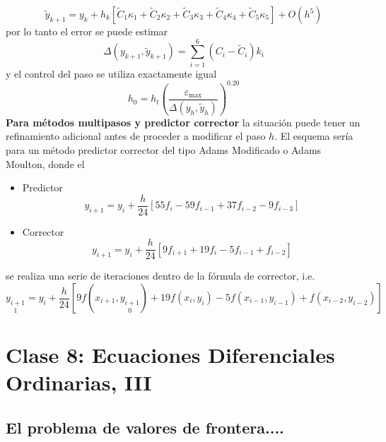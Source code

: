 \documentclass[spanish,titlepage,11pt]{article}
\begin{document}
\[
\tilde{y}_{k+1}=y_{k}+h_{k}\left[  \tilde{C}_{1}\kappa_{1}+\tilde{C}_{2}%
\kappa_{2}+\tilde{C}_{3}\kappa_{3}+\tilde{C}_{4}\kappa_{4}+\tilde{C}_{5}%
\kappa_{5}\right]  +O(h^{5})
\]
por lo tanto el error se puede estimar
\[
\Delta\left(  y_{k+1},\tilde{y}_{k+1}\right)  =\sum_{i=1}^{6}\left(
C_{i}-\tilde{C}_{i}\right)  k_{i}
\]
y el control del paso se utiliza exactamente igual
\[
h_{0}=h_{t}\left(  \frac{\varepsilon_{\max}}{\Delta\left(  y_{h},\tilde{y}%
_{h}\right)  }\right)  ^{0.20}
\]
\textbf{Para m\'{e}todos multipasos y predictor corrector} la situaci\'{o}n
puede tener un refinamiento adicional antes de proceder a modificar el paso
$h$. El esquema ser\'{i}a para un m\'{e}todo predictor corrector del tipo
Adams Modificado o Adams Moulton, donde el

\begin{itemize}
\item  Predictor
\[
y_{i+1}=y_{i}+\frac{h}{24}\left[  55f_{i}-59f_{i-1}+37f_{i-2}-9f_{i-3}%
\right]
\]

\item  Corrector
\[
y_{i+1}=y_{i}+\frac{h}{24}\left[  9f_{i+1}+19f_{i}-5f_{i-1}+f_{i-2}\right]
\]
\newline 
\end{itemize}

se realiza una serie de iteraciones dentro de la f\'{o}rmula de corrector,
i.e.
\[
\underset{1}{y_{i+1}}=y_{i}+\frac{h}{24}\left[  9f\left(  x_{i+1},\underset
{0}{y_{i+1}}\right)  +19f\left(  x_{i},y_{i}\right)  -5f\left(  x_{i-1}%
,y_{i-1}\right)  +f\left(  x_{i-2},y_{i-2}\right)  \right]
\]

\newpage

\section{\textbf{Clase 8: Ecuaciones Diferenciales Ordinarias, III}}

\subsection{El problema de valores de frontera....}
\end{document}
